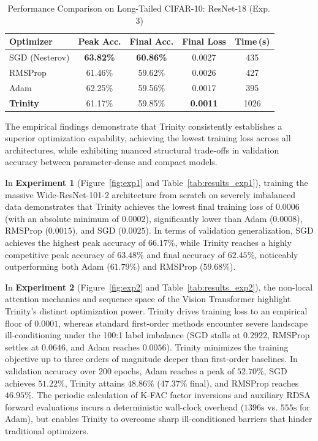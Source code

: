 \documentclass[conference]{IEEEtran}
\begin{document}
\begin{table}[htbp]
\centering
\caption{Performance Comparison on Long-Tailed CIFAR-10: ResNet-18 (Exp.\,3)}
\label{tab:results_exp3}
\setlength{\tabcolsep}{4pt}
\begin{tabular}{lcccc}
\toprule
\textbf{Optimizer} & \textbf{Peak Acc.} & \textbf{Final Acc.} & \textbf{Final Loss} & \textbf{Time\,(s)} \\
\midrule
SGD (Nesterov)      & \textbf{63.82\%} & \textbf{60.86\%} & 0.0027 & 435 \\
RMSProp             & 61.46\% & 59.62\% & 0.0026 & 427 \\
Adam                & 62.25\% & 59.56\% & 0.0017 & 395 \\
\textbf{Trinity}    & 61.17\% & 59.85\% & \textbf{0.0011} & 1026 \\
\bottomrule
\end{tabular}
\end{table}

The empirical findings demonstrate that Trinity consistently establishes a superior optimization capability, achieving the lowest training loss across all architectures, while exhibiting nuanced structural trade-offs in validation accuracy between parameter-dense and compact models.

In \textbf{Experiment 1} (Figure~\ref{fig:exp1} and Table~\ref{tab:results_exp1}), training the massive Wide-ResNet-101-2 architecture from scratch on severely imbalanced data demonstrates that Trinity achieves the lowest final training loss of $\mathbf{0.0006}$ (with an absolute minimum of $0.0002$), significantly lower than Adam ($0.0008$), RMSProp ($0.0015$), and SGD ($0.0025$). In terms of validation generalization, SGD achieves the highest peak accuracy of $66.17\%$, while Trinity reaches a highly competitive peak accuracy of $63.48\%$ and final accuracy of $62.45\%$, noticeably outperforming both Adam ($61.79\%$) and RMSProp ($59.68\%$). 

In \textbf{Experiment 2} (Figure~\ref{fig:exp2} and Table~\ref{tab:results_exp2}), the non-local attention mechanics and sequence space of the Vision Transformer highlight Trinity's distinct optimization power. Trinity drives training loss to an empirical floor of $\mathbf{0.0001}$, whereas standard first-order methods encounter severe landscape ill-conditioning under the 100:1 label imbalance (SGD stalls at $0.2922$, RMSProp settles at $0.0646$, and Adam reaches $0.0056$). Trinity minimizes the training objective up to three orders of magnitude deeper than first-order baselines. In validation accuracy over 200 epochs, Adam reaches a peak of $52.70\%$, SGD achieves $51.22\%$, Trinity attains $48.86\%$ ($47.37\%$ final), and RMSProp reaches $46.95\%$. The periodic calculation of K-FAC factor inversions and auxiliary RDSA forward evaluations incurs a deterministic wall-clock overhead ($1396\text{s}$ vs. $555\text{s}$ for Adam), but enables Trinity to overcome sharp ill-conditioned barriers that hinder traditional optimizers.
\end{document}
